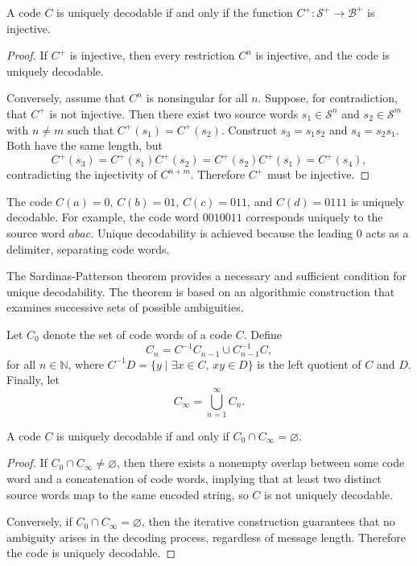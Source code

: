 \begin{proposition}
A code $C$ is uniquely decodable if and only if the function $C^{+}:\mathcal{S}^{+}\rightarrow\mathcal{B}^{+}$ is injective.
\end{proposition}
\begin{proof}
If $C^{+}$ is injective, then every restriction $C^{n}$ is injective, and the code is uniquely decodable.  

Conversely, assume that $C^{n}$ is nonsingular for all $n$. Suppose, for contradiction, that $C^{+}$ is not injective. Then there exist two source words $s_{1} \in \mathcal{S}^{n}$ and $s_{2} \in \mathcal{S}^{m}$ with $n \neq m$ such that $C^{+}(s_{1}) = C^{+}(s_{2})$. Construct $s_{3} = s_{1}s_{2}$ and $s_{4} = s_{2}s_{1}$. Both have the same length, but
\[
C^{+}(s_{3}) = C^{+}(s_{1})C^{+}(s_{2}) = C^{+}(s_{2})C^{+}(s_{1}) = C^{+}(s_{4}),
\]
contradicting the injectivity of $C^{n+m}$. Therefore $C^{+}$ must be injective.
\end{proof}

\begin{example}
\label{ex:uniquely-decodable}
The code $C(a)=0$, $C(b)=01$, $C(c)=011$, and $C(d)=0111$ is uniquely decodable. For example, the code word $0010011$ corresponds uniquely to the source word $abac$. Unique decodability is achieved because the leading $0$ acts as a delimiter, separating code words.
\end{example}

The Sardinas-Patterson theorem provides a necessary and sufficient condition for unique decodability. The theorem is based on an algorithmic construction that examines successive sets of possible ambiguities.

Let $C_0$ denote the set of code words of a code $C$. Define
\[
C_n = C^{-1} C_{n-1} \cup C_{n-1}^{-1} C,
\]
for all $n \in \mathbb{N}$, where $C^{-1}D = \{ y \mid \exists x \in C, \, xy \in D \}$ is the left quotient of $C$ and $D$. Finally, let
\[
C_\infty = \bigcup_{n=1}^{\infty} C_n.
\]

\begin{proposition}
A code $C$ is uniquely decodable if and only if $C_0 \cap C_\infty = \varnothing$.
\end{proposition}
\begin{proof}
If $C_0 \cap C_\infty \neq \varnothing$, then there exists a nonempty overlap between some code word and a concatenation of code words, implying that at least two distinct source words map to the same encoded string, so $C$ is not uniquely decodable.  

Conversely, if $C_0 \cap C_\infty = \varnothing$, then the iterative construction guarantees that no ambiguity arises in the decoding process, regardless of message length. Therefore the code is uniquely decodable.  
\end{proof}

